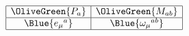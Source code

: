 \begin{equation}
 \begin{array}{|c|c|}\hline
  \OliveGreen{P_a} & \OliveGreen{M_{ab}} \\ \hline
  \Blue{e_\mu{} ^a} & \Blue{\omega _\mu{}^{ab} }\\ \hline
\end{array}
 \label{gravitygaugef}
\end{equation}

